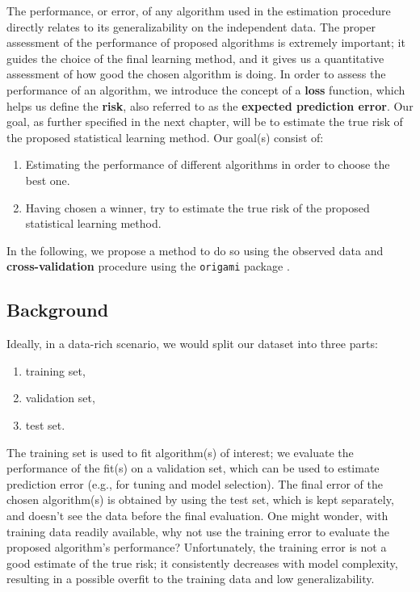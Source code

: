 \documentclass[12pt, krantz2,]{krantz}
\providecommand{\tightlist}{%
  \setlength{\itemsep}{0pt}\setlength{\parskip}{0pt}}
\theoremstyle{definition}
\theoremstyle{definition}
\theoremstyle{definition}
\newcommand{\1}{\mathbbm{1}}
\begin{document}
The performance, or error, of any algorithm used in the estimation procedure
directly relates to its generalizability on the independent data. The proper
assessment of the performance of proposed algorithms is extremely important; it
guides the choice of the final learning method, and it gives us a quantitative
assessment of how good the chosen algorithm is doing. In order to assess the
performance of an algorithm, we introduce the concept of a \textbf{loss} function,
which helps us define the \textbf{risk}, also referred to as the \textbf{expected
prediction error}. Our goal, as further specified in the next chapter, will be
to estimate the true risk of the proposed statistical learning method. Our
goal(s) consist of:

\begin{enumerate}
\def\labelenumi{\arabic{enumi}.}
\tightlist
\item
  Estimating the performance of different algorithms in order to choose the
  best one.
\item
  Having chosen a winner, try to estimate the true risk of the proposed
  statistical learning method.
\end{enumerate}

In the following, we propose a method to do so using the observed data and
\textbf{cross-validation} procedure using the \texttt{origami} package \citep{coyle2018origami}.

\hypertarget{background}{%
\subsection{Background}\label{background}}

Ideally, in a data-rich scenario, we would split our dataset into three parts:

\begin{enumerate}
\def\labelenumi{\arabic{enumi}.}
\tightlist
\item
  training set,
\item
  validation set,
\item
  test set.
\end{enumerate}

The training set is used to fit algorithm(s) of interest; we evaluate the
performance of the fit(s) on a validation set, which can be used to estimate
prediction error (e.g., for tuning and model selection). The final error of the
chosen algorithm(s) is obtained by using the test set, which is kept separately,
and doesn't see the data before the final evaluation. One might wonder, with
training data readily available, why not use the training error to evaluate the
proposed algorithm's performance? Unfortunately, the training error is not a
good estimate of the true risk; it consistently decreases with model complexity,
resulting in a possible overfit to the training data and low generalizability.
\end{document}
